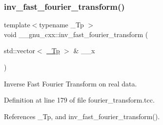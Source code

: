 \subsubsection{\texorpdfstring{inv\+\_\+fast\+\_\+fourier\+\_\+transform()}{inv\_fast\_fourier\_transform()}\hspace{0.1cm}{\footnotesize\ttfamily [2/3]}}
{\footnotesize\ttfamily template$<$typename \+\_\+\+Tp $>$ \\
void \+\_\+\+\_\+gnu\+\_\+cxx\+::inv\+\_\+fast\+\_\+fourier\+\_\+transform (\begin{DoxyParamCaption}\item[{std\+::vector$<$ \hyperlink{namespace____gnu__cxx_a3b19a9c800ca194374ef9172290f7d79}{\+\_\+\+Tp} $>$ \&}]{\+\_\+\+\_\+x }\end{DoxyParamCaption})}

Inverse Fast Fourier Transform on real data. 

Definition at line 179 of file fourier\+\_\+transform.\+tcc.



References \+\_\+\+Tp, and inv\+\_\+fast\+\_\+fourier\+\_\+transform().


